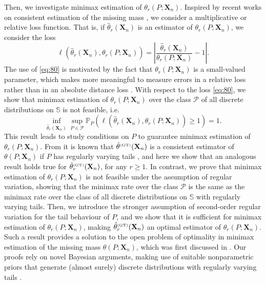 \documentclass{article}
\newcommand{\1}{\boldsymbol{1}}
\theoremstyle{plain}
\begin{document}
Then, we investigate minimax estimation of $\theta_{r}(P;\mathbf{X}_{n})$. Inspired by recent works on consistent estimation of the missing mass \cite{Oha(12),Mos(15), Fad(18)}, we consider a multiplicative or relative loss function. That is, if $\hat{\theta}_{r}(\mathbf{X}_{n})$ is an estimator of $\theta_{r}(P;\mathbf{X}_{n})$, we consider the loss
\begin{equation}\label{eq:80}
  \ell(\hat{\theta}_r(\mathbf{X}_{n}),\theta_r(P;\mathbf{X}_{n}))=\left|\frac{\hat{\theta}_r(\mathbf{X}_n)}{\theta_r(P;\mathbf{X}_n)} - 1\right|.
\end{equation}
The use of \eqref{eq:80} is motivated by the fact that $\theta_{r}(P;\mathbf{X}_{n})$ is a small-valued parameter, which makes more meaningful to measure errors in a relative loss rather than in an absolute distance loss \cite{Oha(12)}. With respect to the loss \eqref{eq:80}, we show that minimax estimation of $\theta_{r}(P;\mathbf{X}_{n})$ over the class $\mathcal{P}$ of all discrete distributions on $\mathbb{S}$ is not feasible, i.e.
\begin{displaymath}
\inf_{\hat{\theta}_{r}(\mathbf{X}_{n})}\sup_{P\in\mathcal{P}}\mathbb{P}_{P}(\ell(\hat{\theta}_r(\mathbf{X}_{n}),\theta_r(P;\mathbf{X}_{n}))\geq1)=1.
\end{displaymath} 
This result leads to study conditions on $P$ to guarantee minimax estimation of $\theta_{r}(P;\mathbf{X}_{n})$. From \cite{Oha(12),Fad(18)} it is known that $\hat{\theta}^{\text{\tiny{(GT)}}}(\mathbf{X}_{n})$ is a consistent estimator of $\theta(P;\mathbf{X}_{n})$ if $P$ has regularly varying tails \cite{Bin(87),Gne(07)}, and here we show that an analogous result holds true for $\hat{\theta}_{r}^{\text{\tiny{(GT)}}}(\mathbf{X}_{n})$, for any $r\geq1$. In contrast, we prove that minimax estimation of $\theta_r(P;\mathbf{X}_{n})$ is not feasible under the assumption of regular variation, showing that the minimax rate over the class $\mathcal{P}$ is the same as the minimax rate over the class of all discrete distributions on $\mathbb{S}$ with regularly varying tails. Then, we introduce the stronger assumption of second-order regular variation for the tail behaviour of $P$, and we show that it is sufficient for minimax estimation of $\theta_r(P;\mathbf{X}_{n})$, making $\hat{\theta}_{r}^{\text{\tiny{(GT)}}}(\mathbf{X}_{n})$ an optimal estimator of $\theta_{r}(P;\mathbf{X}_{n})$. Such a result provides a solution to the open problem of optimality in minimax estimation of the missing mass $\theta(P;\mathbf{X}_{n})$, which was first discussed in \cite{Fad(18)}. Our proofs rely on novel Bayesian arguments, making use of suitable nonparametric priors that generate (almost surely) discrete distributions with regularly varying tails \cite{Pit(97),Gne(07)}.
\end{document}
